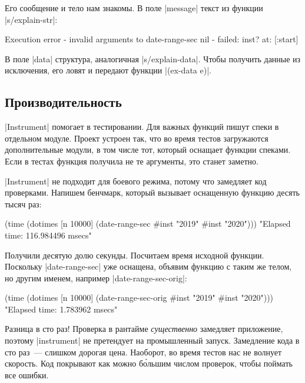 Его сообщение и тело нам знакомы. В поле \spverb|message| текст из функции
\spverb|s/explain-str|:

\begin{english}
  \begin{clojure}
Execution error - invalid arguments to date-range-sec
nil - failed: inst? at: [:start]
  \end{clojure}
\end{english}

В поле \spverb|data| структура, аналогичная \spverb|s/explain-data|. Чтобы
получить данные из исключения, его ловят и передают функции \spverb|(ex-data e)|.

\subsection{Производительность}

\spverb|Instrument| помогает в тестировании. Для важных функций пишут спеки в
отдельном модуле. Проект устроен так, что во время тестов загружаются
дополнительные модули, в том числе тот, который оснащает функции спеками. Если в
тестах функция получила не те аргументы, это станет заметно.

\spverb|Instrument| не подходит для боевого режима, потому что замедляет код
проверками. Напишем бенчмарк, который вызывает оснащенную функцию десять тысяч
раз:

\begin{english}
  \begin{clojure}
(time
 (dotimes [n 10000]
   (date-range-sec #inst "2019" #inst "2020")))
"Elapsed time: 116.984496 msecs"
  \end{clojure}
\end{english}

Получили десятую долю секунды. Посчитаем время исходной функции. Поскольку
\spverb|date-range-sec| уже оснащена, объявим функцию с таким же телом, но
другим именем, например \spverb|date-range-sec-orig|:

\begin{english}
  \begin{clojure}
(time
 (dotimes [n 10000]
   (date-range-sec-orig #inst "2019" #inst "2020")))
"Elapsed time: 1.783962 msecs"
  \end{clojure}
\end{english}

Разница в сто раз! Проверка в рантайме \emph{существенно} замедляет приложение,
поэтому \spverb|instrument| не претендует на промышленный запуск. Замедление
кода в сто раз~--- слишком дорогая цена. Наоборот, во время тестов нас не
волнует скорость. Код покрывают как можно б\'{о}льшим числом проверок, чтобы
поймать все ошибки.

